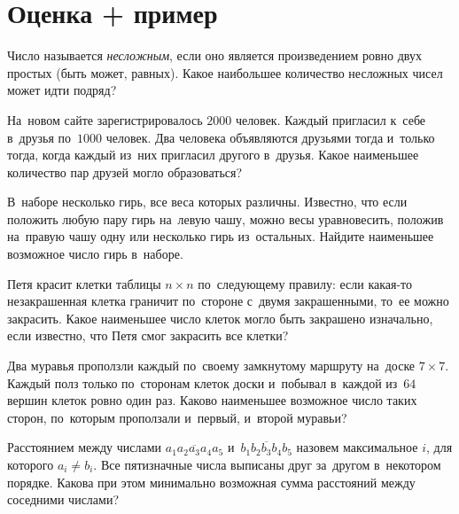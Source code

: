 
\section*{Оценка + пример}

\begin{problems}

\item
Число называется \emph{несложным}, если оно является произведением ровно двух
простых (быть может, равных).
Какое наибольшее количество несложных чисел может идти подряд?

\item
На~новом сайте зарегистрировалось $2000$ человек.
Каждый пригласил к~себе в~друзья по~$1000$ человек.
Два человека объявляются друзьями тогда и~только тогда, когда каждый из~них
пригласил другого в~друзья.
Какое наименьшее количество пар друзей могло образоваться?

\item
В~наборе несколько гирь, все веса которых различны.
Известно, что если положить любую пару гирь на~левую чашу, можно весы
уравновесить, положив на~правую чашу одну или несколько гирь из~остальных.
Найдите наименьшее возможное число гирь в~наборе.

\item
Петя красит клетки таблицы $n \times n$ по~следующему правилу: если какая-то
незакрашенная клетка граничит по~стороне с~двумя закрашенными, то~ее можно
закрасить.
Какое наименьшее число клеток могло быть закрашено изначально, если известно,
что Петя смог закрасить все клетки?

\item
Два муравья проползли каждый по~своему замкнутому маршруту
на~доске $7 \times 7$.
Каждый полз только по~сторонам клеток доски и~побывал в~каждой из~$64$ вершин
клеток ровно один раз.
Каково наименьшее возможное число таких сторон, по~которым проползали и~первый,
и~второй муравьи?

\item
Расстоянием между числами $\overline{a_1 a_2 a_3 a_4 a_5}$
и~$\overline{b_1 b_2 b_3 b_4 b_5}$ назовем
максимальное $i$, для которого $a_i \neq b_i$.
Все пятизначные числа выписаны друг за~другом в~некотором порядке.
Какова при этом минимально возможная сумма расстояний между соседними числами?

\iffalse
\item
На~окружности расположена тысяча непересекающихся дуг, и~на~каждой из~них
написаны два натуральных числа.
Сумма чисел каждой дуги делится на~произведение чисел дуги, следующей за~ней
по~часовой стрелке.
Каково наибольшее возможное значение наибольшего из~написанных чисел?
\fi


\end{problems}
